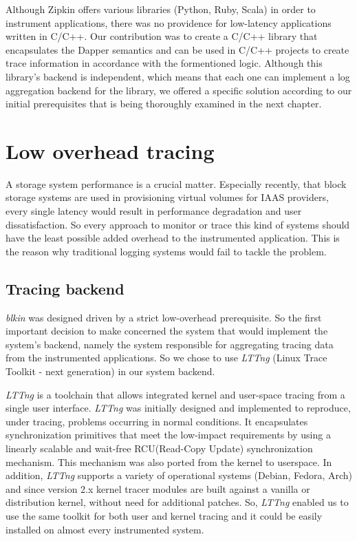\documentclass[a4paper,12pt]{article}
\begin{document}
Although Zipkin offers various libraries (Python, Ruby, Scala) in order to 
instrument applications, there was no providence for low-latency applications 
written in C/C++. Our contribution was to create a C/C++ library 
that encapsulates the Dapper semantics and can be used in C/C++ projects to 
create trace information in accordance with the formentioned logic. Although 
this library's backend is independent, which means that each one can implement
a log aggregation backend for the library, we offered a specific solution 
according  to our initial prerequisites that is being thoroughly examined in the 
next chapter.

\section{Low overhead tracing}
A storage system performance is a crucial matter. Especially recently, that
block storage systems are used in provisioning virtual volumes for IAAS 
providers, every single latency would result in performance degradation and user
dissatisfaction. So every approach to monitor or trace this kind of systems 
should have the least possible added overhead to the instrumented application. 
This is the reason why traditional logging systems would fail to tackle the 
problem.

\subsection{Tracing backend}
\emph{blkin} was designed driven by a strict low-overhead prerequisite. So the 
first important decision to make concerned the system that would implement the
system's backend, namely the system responsible for aggregating tracing data
from the instrumented applications. So we chose to use \emph{LTTng} (Linux Trace
Toolkit - next generation)\cite{lttng} in our system backend.

\emph{LTTng} is a toolchain that allows integrated kernel and user-space tracing
from a single user interface. \emph{LTTng} was initially designed and 
implemented to reproduce, under tracing, problems occurring in normal 
conditions. It encapsulates synchronization primitives that meet the low-impact
requirements by using a linearly scalable and wait-free RCU(Read-Copy Update) 
synchronization mechanism. This mechanism was also ported from the kernel to 
userspace. In addition, \emph{LTTng} supports a variety of operational systems
(Debian, Fedora, Arch) and since version 2.x kernel tracer modules are built 
against a vanilla or distribution kernel, without need for additional patches.
So, \emph{LTTng} enabled us to use the same toolkit for both user and kernel 
tracing and it could be easily installed on almost every instrumented system.
\end{document}
